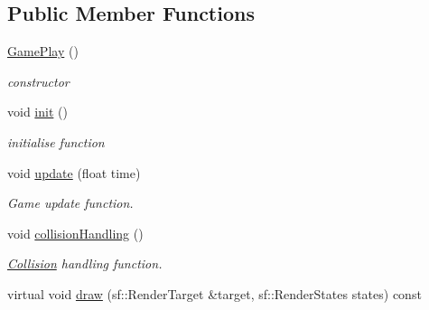 \subsection*{Public Member Functions}
\begin{DoxyCompactItemize}
\item 
\hypertarget{class_game_play_a3e82b490b9780b0df24a88a9efc6709f}{\hyperlink{class_game_play_a3e82b490b9780b0df24a88a9efc6709f}{Game\-Play} ()}\label{class_game_play_a3e82b490b9780b0df24a88a9efc6709f}

\begin{DoxyCompactList}\small\item\em constructor \end{DoxyCompactList}\item 
void \hyperlink{class_game_play_aeac8436214d80bb44f4a3f41ffed6314}{init} ()
\begin{DoxyCompactList}\small\item\em initialise function \end{DoxyCompactList}\item 
void \hyperlink{class_game_play_a32f780550fae20146e6d6bf844ee3eae}{update} (float time)
\begin{DoxyCompactList}\small\item\em Game update function. \end{DoxyCompactList}\item 
void \hyperlink{class_game_play_adc7a40e331c11d6484b4fe625da96156}{collision\-Handling} ()
\begin{DoxyCompactList}\small\item\em \hyperlink{class_collision}{Collision} handling function. \end{DoxyCompactList}\item 
\hypertarget{class_game_play_aa3e1d8529f943df0a459a08546984681}{virtual void \hyperlink{class_game_play_aa3e1d8529f943df0a459a08546984681}{draw} (sf\-::\-Render\-Target \&target, sf\-::\-Render\-States states) const }\label{class_game_play_aa3e1d8529f943df0a459a08546984681}


\end{DoxyCompactItemize}
